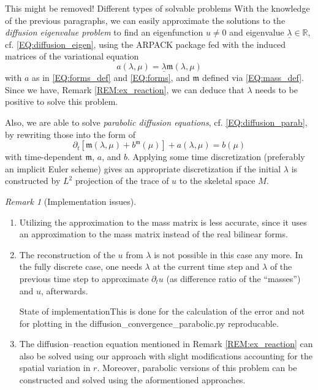\documentclass[a4paper, english, 12pt, reqno, draft]{amsart}
\makeatletter
\theoremstyle{definition}
\theoremstyle{remark}
\newtheorem{remark}[theorem]{Remark}
\numberwithin{equation}{section}
\newcommand{\IR}{\ensuremath{\mathbb R}}
\newcommand{\skeletalSpace}{\ensuremath{M}}
\newcommand{\mass}{\ensuremath{\mathfrak m}}
\newcommand{\eigenval}{\ensuremath{\underline \lambda}}
\def\paragraph{\@startsection{paragraph}{4}%
  \z@\z@{-\fontdimen2\font}%
  {\normalfont\scshape}}
\makeatother
\begin{document}
\begin{envarfatal}{This might be removed!}
\paragraph{Different types of solvable problems}
% 
With the knowledge of the previous paragraphs, we can easily approximate the solutions to the \emph{diffusion eigenvalue problem} to find an eigenfunction $u \neq 0$ and eigenvalue $\eigenval \in \IR$, cf. \eqref{EQ:diffusion_eigen}, using the ARPACK package fed with the induced matrices of the variational equation
% 
\begin{equation}
 a(\lambda, \mu) = \eigenval \mass(\lambda,\mu)
\end{equation}
% 
with $a$ as in \eqref{EQ:forms_def} and \eqref{EQ:forms}, and $\mass$ defined via \eqref{EQ:mass_def}. Since we have, Remark \ref{REM:ex_reaction}, we can deduce that $\lambda$ needs to be positive to solve this problem.
 
Also, we are able to solve \emph{parabolic diffusion equations}, cf. \eqref{EQ:diffusion_parab}, by rewriting those into the form of
% 
\begin{equation}
 \partial_t \left[ \mass(\lambda, \mu) + b^\mass(\mu) \right] + a(\lambda, \mu) = b(\mu)
\end{equation}
% 
with time-dependent $\mass$, $a$, and $b$. Applying some time discretization (preferably an implicit Euler scheme) gives an appropriate discretization if the initial $\lambda$ is constructed by $L^2$ projection of the trace of $u$ to the skeletal space $\skeletalSpace$.
% 
\begin{remark}[Implementation issues]\
 \begin{enumerate}
  \item Utilizing the approximation to the mass matrix is less accurate, since it uses an approximation to the mass matrix instead of the real bilinear forms.
  \item The reconstruction of the $u$ from $\lambda$ is not possible in this case any more. In the fully discrete case, one needs $\lambda$ at the current time step and $\lambda$ of the previous time step to approximate $\partial_t u$ (as difference ratio of the ``masses'') and $u$, afterwards.
  \begin{envarwarning}{State of implementation}This is done for the calculation of the error and not for plotting in the diffusion\_convergence\_parabolic.py reproducable.\end{envarwarning}
  \item The diffusion--reaction equation mentioned in Remark \ref{REM:ex_reaction} can also be solved using our approach with slight modifications accounting for the spatial variation in $r$. Moreover, parabolic versions of this problem can be constructed and solved using the aformentioned approaches.
 \end{enumerate}
\end{remark}
% 

\end{envarfatal}
\end{document}
